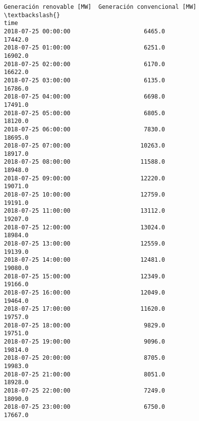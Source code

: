 \documentclass[11pt]{article}
\begin{document}
\begin{tcolorbox}[breakable, size=fbox, boxrule=.5pt, pad at break*=1mm, opacityfill=0]
\begin{Verbatim}[commandchars=\\\{\}]
                     Generación renovable [MW]  Generación convencional [MW]  \textbackslash{}
time
2018-07-25 00:00:00                     6465.0                       17442.0
2018-07-25 01:00:00                     6251.0                       16902.0
2018-07-25 02:00:00                     6170.0                       16622.0
2018-07-25 03:00:00                     6135.0                       16786.0
2018-07-25 04:00:00                     6698.0                       17491.0
2018-07-25 05:00:00                     6805.0                       18120.0
2018-07-25 06:00:00                     7830.0                       18695.0
2018-07-25 07:00:00                    10263.0                       18917.0
2018-07-25 08:00:00                    11588.0                       18948.0
2018-07-25 09:00:00                    12220.0                       19071.0
2018-07-25 10:00:00                    12759.0                       19191.0
2018-07-25 11:00:00                    13112.0                       19207.0
2018-07-25 12:00:00                    13024.0                       18984.0
2018-07-25 13:00:00                    12559.0                       19139.0
2018-07-25 14:00:00                    12481.0                       19080.0
2018-07-25 15:00:00                    12349.0                       19166.0
2018-07-25 16:00:00                    12049.0                       19464.0
2018-07-25 17:00:00                    11620.0                       19757.0
2018-07-25 18:00:00                     9829.0                       19751.0
2018-07-25 19:00:00                     9096.0                       19814.0
2018-07-25 20:00:00                     8705.0                       19983.0
2018-07-25 21:00:00                     8051.0                       18928.0
2018-07-25 22:00:00                     7249.0                       18090.0
2018-07-25 23:00:00                     6750.0                       17667.0


\end{Verbatim}
\end{tcolorbox}
\end{document}
